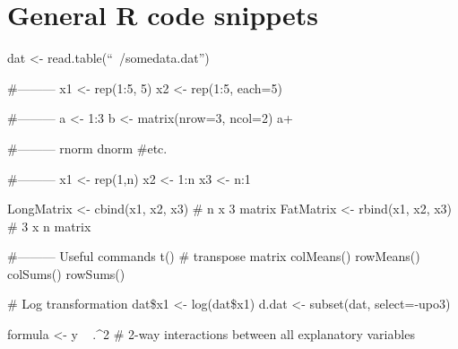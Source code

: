 \section{General R code snippets}
\begin{code}
 dat <- read.table(``~/somedata.dat'')
 
 #---------
 x1 <- rep(1:5, 5)
 x2 <- rep(1:5, each=5)

 #---------
 a <- 1:3
 b <- matrix(nrow=3, ncol=2)
 a+
 
 #---------
 rnorm
 dnorm
 #etc.

 #---------
 x1 <- rep(1,n)
 x2 <- 1:n
 x3 <- n:1
 
 LongMatrix <- cbind(x1, x2, x3) # n x 3 matrix
 FatMatrix  <- rbind(x1, x2, x3) # 3 x n matrix
 
 #--------- Useful commands
 t() # transpose matrix
 colMeans()
 rowMeans()
 colSums()
 rowSums()
 
 # Log transformation
 dat\$x1 <- log(dat\$x1)
 d.dat <- subset(dat, select=-upo3)
 
 formula <- y ~ .^2 # 2-way interactions between all explanatory variables

 \end{code}

